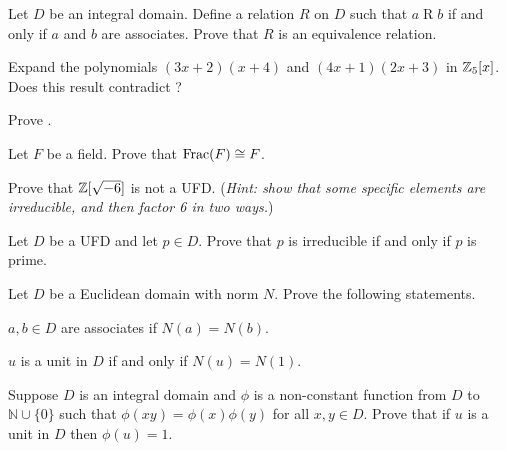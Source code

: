 \begin{problem}
    Let $D$ be an integral domain. Define a relation $R$ on $D$ such that $a\mathrel{R}b$ if and only if $a$ and $b$ are associates. Prove that $R$ is an equivalence relation.
\end{problem}

\begin{problem}
    Expand the polynomials $(3x+2)(x+4)$ and $(4x+1)(2x+3)$ in $\mathbb{Z}_5[x]$. Does this result contradict ?
\end{problem}

\begin{problem}\label{problem-prime-element-iff-generates-prime-ideal}
    Prove .
\end{problem}

\begin{problem}
    Let $F$ be a field. Prove that $\mathrm{Frac}(F) \cong F$.
\end{problem}

\begin{problem}
    Prove that $\mathbb{Z}[\sqrt{-6}]$ is not a UFD.\newline
    (\textit{Hint: show that some specific elements are irreducible, and then factor 6 in two ways.})
\end{problem}

\begin{problem}
    Let $D$ be a UFD and let $p \in D$. Prove that $p$ is irreducible if and only if $p$ is prime.
\end{problem}

\begin{problem}
    Let $D$ be a Euclidean domain with norm $N$. Prove the following statements.
    \begin{partquestions}{\alph*}
        \item $a,b \in D$ are associates if $N(a) = N(b)$.
        \item $u$ is a unit in $D$ if and only if $N(u) = N(1)$.
    \end{partquestions}
\end{problem}

\begin{problem}
    Suppose $D$ is an integral domain and $\phi$ is a non-constant function from $D$ to $\mathbb{N} \cup \{0\}$ such that $\phi(xy) = \phi(x)\phi(y)$ for all $x,y\in D$. Prove that if $u$ is a unit in $D$ then $\phi(u) = 1$.
\end{problem}

